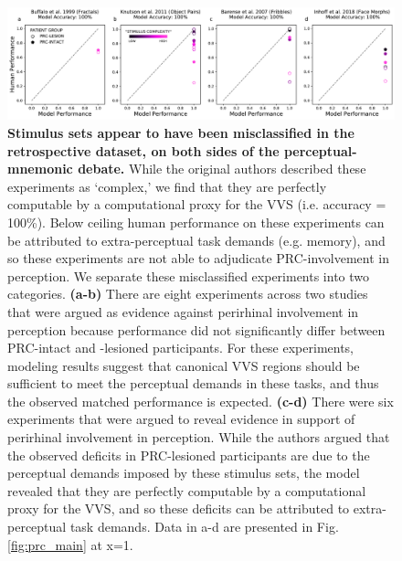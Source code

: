 \documentclass[11pt]{article}
\begin{document}
\begin{figure}[ht]
\centering
\renewcommand{\figurename}{Supplementary Figure}
\includegraphics[width=\linewidth]{figures/non_diagnostic_visualization}
\caption{\textbf{Stimulus sets appear to have been misclassified in the retrospective dataset, on both sides of the perceptual-mnemonic debate.} While the original authors described these experiments as `complex,' we find that they are perfectly computable by a computational proxy for the VVS (i.e. accuracy = 100\%). Below ceiling human performance on these experiments can be attributed to extra-perceptual task demands (e.g. memory), and so these experiments are not able to adjudicate PRC-involvement in perception. We separate these misclassified experiments into two categories. \textbf{(a-b)} There are eight experiments across two studies that were argued as evidence against perirhinal involvement in perception because performance did not significantly differ between PRC-intact and -lesioned participants. For these experiments, modeling results suggest that canonical VVS regions should be sufficient to meet the perceptual demands in these tasks, and thus the observed matched performance is expected. \textbf{(c-d)} There were six experiments that were argued to reveal evidence in support of perirhinal involvement in perception. While the authors argued that the observed deficits in PRC-lesioned participants are due to the perceptual demands imposed by these stimulus sets, the model revealed that they are perfectly computable by a computational proxy for the VVS, and so these deficits can be attributed to extra-perceptual task demands. Data in a-d are presented in Fig. \ref{fig:prc_main} at x=1.}
\label{fig:misclassified}
\end{figure}
\end{document}
